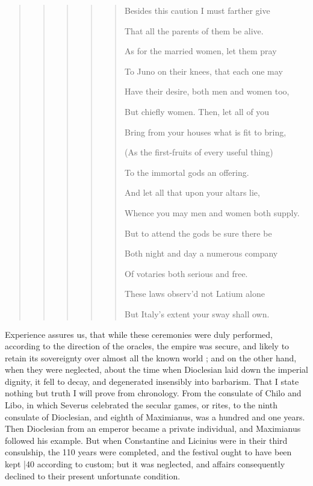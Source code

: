 \begin{quote}
\begin{quote}
\begin{quote}
\begin{quote}
\begin{quote}
Besides this caution I must farther give

That all the parents of them be alive.

As for the married women, let them pray

To Juno on their knees, that each one may

Have their desire, both men and women too,

But chiefly women. Then, let all of you

Bring from your houses what is fit to bring,

(As the first-fruits of every useful thing)

To the immortal gods an offering.

And let all that upon your altars lie,

Whence you may men and women both supply.

But to attend the gods be sure there be

Both night and day a numerous company

Of votaries both serious and free.

These laws observ'd not Latium alone

But Italy's extent your sway shall own.

\end{quote}

\end{quote}

\end{quote}

\end{quote}

\end{quote}

Experience assures us, that while these ceremonies were duly performed, according to the direction of the oracles, the empire was secure, and likely to retain its sovereignty over almost all the known world ; and on the other hand, when they were neglected, about the time when Dioclesian laid down the imperial dignity, it fell to decay, and degenerated insensibly into barbarism. That I state nothing but truth I will prove from chronology. From the consulate of Chilo and Libo, in which Severus celebrated the secular games, or rites, to the ninth consulate of Dioclesian, and eighth of Maximianus, was a hundred and one years. Then Dioclesian from an emperor became a private individual, and Maximianus followed his example. But when Constantine and Licinius were in their third consulship, the 110 years were completed, and the festival ought to have been kept
|40 according to custom; but it was neglected, and affairs consequently declined to their present unfortunate condition.

